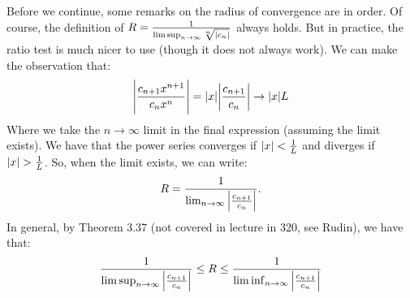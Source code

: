 \noindent Before we continue, some remarks on the radius of convergence are in order. Of course, the definition of $R = \frac{1}{\limsup_{n \rightarrow \infty}\sqrt[n]{\abs{c_n}}}$ always holds. But in practice, the ratio test is much nicer to use (though it does not always work). We can make the observation that:
\begin{align*}
    \abs{\frac{c_{n+1}x^{n+1}}{c_nx^n}} = \abs{x}\abs{\frac{c_{n+1}}{c_n}} \rightarrow \abs{x}L
\end{align*}
Where we take the $n \rightarrow \infty$ limit in the final expression (assuming the limit exists). We have that the power series converges if $\abs{x} < \frac{1}{L}$ and diverges if $\abs{x} > \frac{1}{L}$. So, when the limit exists, we can write:
\begin{align*}
    R = \frac{1}{\lim_{n \rightarrow \infty}\abs{\frac{c_{n+1}}{c_n}}}.
\end{align*}
In general, by Theorem 3.37 (not covered in lecture in 320, see Rudin), we have that:
\begin{align*}
    \frac{1}{\limsup_{n \rightarrow \infty}\abs{\frac{c_{n+1}}{c_n}}} \leq R \leq \frac{1}{\liminf_{n \rightarrow \infty}\abs{\frac{c_{n+1}}{c_n}}}
\end{align*}

